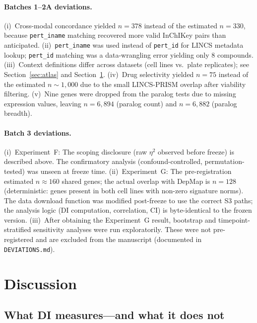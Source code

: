 \documentclass[11pt]{article}
\begin{document}
\paragraph{Batches 1--2A deviations.}
(i)~Cross-modal concordance yielded $n = 378$ instead of the estimated $n = 330$, because
\texttt{pert\_iname} matching recovered more valid InChIKey pairs than
anticipated.
(ii)~\texttt{pert\_iname} was used instead of \texttt{pert\_id} for
LINCS metadata lookup; \texttt{pert\_id} matching was a data-wrangling
error yielding only 8 compounds.
(iii)~Context definitions differ across datasets (cell lines vs.\ plate
replicates); see Section~\ref{sec:atlas} and Section~\ref{sec:discussion}.
(iv)~Drug selectivity yielded $n = 75$ instead of the estimated $n \sim 1{,}000$ due
to the small LINCS-PRISM overlap after viability filtering.
(v)~Nine genes were dropped from the paralog tests due to missing
expression values, leaving $n = 6{,}894$ (paralog count) and
$n = 6{,}882$ (paralog breadth).

\paragraph{Batch 3 deviations.}
(i)~Experiment~F: The scoping disclosure (raw $\eta^2$ observed before
freeze) is described above.  The confirmatory analysis
(confound-controlled, permutation-tested) was unseen at freeze time.
(ii)~Experiment~G: The pre-registration estimated $n \approx 160$ shared
genes; the actual overlap with DepMap is $n = 128$ (deterministic:
genes present in both cell lines with non-zero signature norms).
The data download function was modified post-freeze to use the correct
S3 paths; the analysis logic (DI computation, correlation, CI) is
byte-identical to the frozen version.
(iii)~After obtaining the Experiment~G result, bootstrap and
timepoint-stratified sensitivity analyses were run exploratorily.
These were not pre-registered and are excluded from the manuscript
(documented in \texttt{DEVIATIONS.md}).


\section{Discussion}
\label{sec:discussion}

\subsection{What DI measures---and what it does not}
\end{document}
